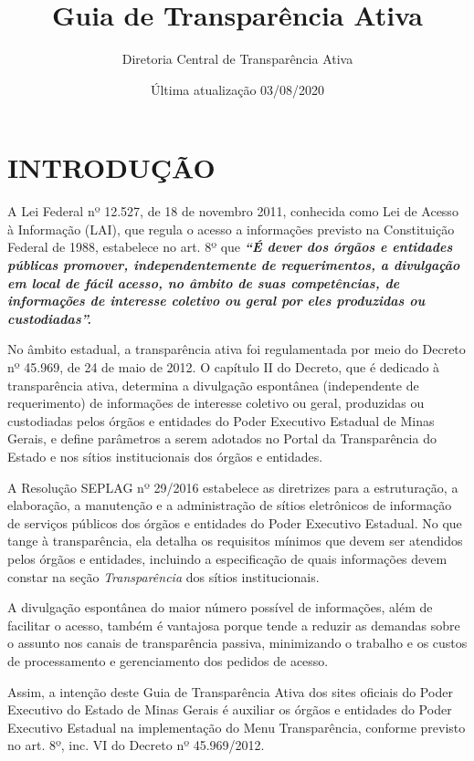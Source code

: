 \documentclass[]{book}
\title{Guia de Transparência Ativa}
\author{Diretoria Central de Transparência Ativa}
\date{Última atualização 03/08/2020}
\begin{document}
\maketitle

{
\setcounter{tocdepth}{1}
\tableofcontents
}
\hypertarget{introduuxe7uxe3o}{%
\chapter{INTRODUÇÃO}\label{introduuxe7uxe3o}}

A Lei Federal nº 12.527, de 18 de novembro 2011, conhecida como Lei de Acesso à Informação (LAI), que regula o acesso a informações previsto na Constituição Federal de 1988, estabelece no art. 8º que \textbf{\emph{``É dever dos órgãos e entidades públicas promover, independentemente de requerimentos, a divulgação em local de fácil acesso, no âmbito de suas competências, de informações de interesse coletivo ou geral por eles produzidas ou custodiadas''.}}

No âmbito estadual, a transparência ativa foi regulamentada por meio do Decreto nº 45.969, de 24 de maio de 2012. O capítulo II do Decreto, que é dedicado à transparência ativa, determina a divulgação espontânea (independente de requerimento) de informações de interesse coletivo ou geral, produzidas ou custodiadas pelos órgãos e entidades do Poder Executivo Estadual de Minas Gerais, e define parâmetros a serem adotados no Portal da Transparência do Estado e nos sítios institucionais dos órgãos e entidades.

A Resolução SEPLAG nº 29/2016 estabelece as diretrizes para a estruturação, a elaboração, a manutenção e a administração de sítios eletrônicos de informação de serviços públicos dos órgãos e entidades do Poder Executivo Estadual. No que tange à transparência, ela detalha os requisitos mínimos que devem ser atendidos pelos órgãos e entidades, incluindo a especificação de quais informações devem constar na seção \emph{Transparência} dos sítios institucionais.

A divulgação espontânea do maior número possível de informações, além de facilitar o acesso, também é vantajosa porque tende a reduzir as demandas sobre o assunto nos canais de transparência passiva, minimizando o trabalho e os custos de processamento e gerenciamento dos pedidos de acesso.

Assim, a intenção deste Guia de Transparência Ativa dos sites oficiais do Poder Executivo do Estado de Minas Gerais é auxiliar os órgãos e entidades do Poder Executivo Estadual na implementação do Menu Transparência, conforme previsto no art. 8º, inc. VI do Decreto nº 45.969/2012.
\end{document}
